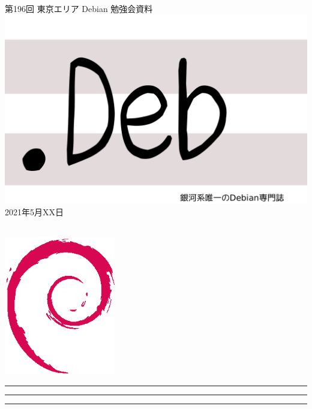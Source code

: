 \documentclass[mingoth,a4paper]{jsarticle}
\newcommand{\debmtgyear}{2021}
\newcommand{\debmtgmonth}{5}
\newcommand{\debmtgdate}{XX}
\newcommand{\debmtgnumber}{196}
\begin{document}
\begin{titlepage}
\thispagestyle{empty}

\vspace*{-2cm}
第\debmtgnumber{}回 東京エリア Debian 勉強会資料\\
\hspace*{-2cm}
\includegraphics{image-assets/dotdeb.pdf}\\
\hfill{}\debmtgyear{}年\debmtgmonth{}月\debmtgdate{}日

\\

\vspace*{-2cm}
\hfill{}\includegraphics[height=6cm]{image-assets/openlogo-nd.eps}
\end{titlepage}

\newpage

\begin{minipage}[b]{0.2\hsize}
 \colorbox{titleback}{}
\end{minipage}
\begin{minipage}[b]{0.8\hsize}
\hrule
\vspace{2mm}
\hrule
\begin{multicols}{2}
\tableofcontents
\end{multicols}
\vspace{2mm}
\hrule
\end{minipage}
\end{document}
